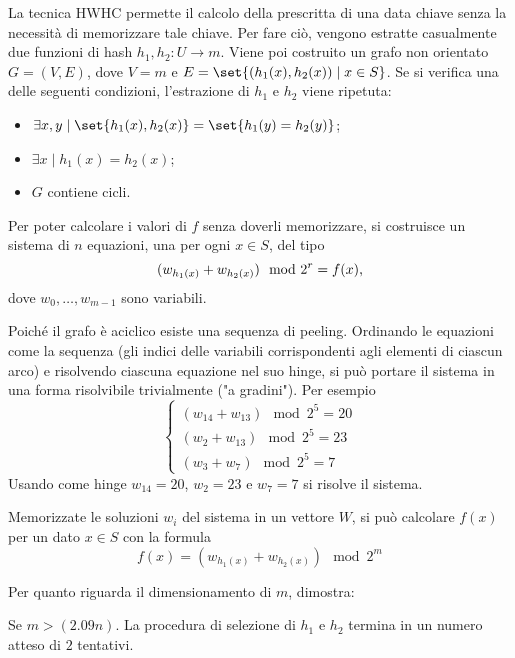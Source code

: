 La tecnica HWHC permette il calcolo della prescritta di una data chiave senza la necessità di memorizzare tale chiave. Per fare ciò, vengono estratte casualmente due funzioni di hash $h_1,h_2:U\to m$.
Viene poi costruito un grafo non orientato $G=(V,E)$, dove $V=m$ e $E=\set{(h_1(x),h_2(x))\mid x\in S}$.
Se si verifica una delle seguenti condizioni, l'estrazione di $h_1$ e $h_2$ viene ripetuta:
\begin{itemize}
	\item $\exists x,y\mid \set{h_1(x),h_2(x)}=\set{h_1(y)=h_2(y)}$;
	\item $\exists x\mid h_1(x)=h_2(x)$;
	\item $G$ contiene cicli.
\end{itemize}

Per poter calcolare i valori di $f$ senza doverli memorizzare, si costruisce un sistema di $n$ equazioni, una per ogni $x\in S$, del tipo
\begin{equation*}
	(w_{h_1(x)} + w_{h_2(x)}) \mod 2^r = f(x) \text,
\end{equation*}
dove $w_0,\dots,w_{m-1}$ sono variabili.

Poiché il grafo è aciclico esiste una sequenza di peeling. Ordinando le equazioni come la sequenza (gli indici delle variabili corrispondenti agli elementi di ciascun arco) e risolvendo ciascuna equazione nel suo hinge, si può portare il sistema in una forma risolvibile trivialmente ("a gradini").
Per esempio
\begin{equation*}
	\begin{cases}
		(w_{14} + w_{13}) \mod 2^5 = 20 \\
		(w_{2} + w_{13}) \mod 2^5 = 23  \\
		(w_{3} + w_{7}) \mod 2^5 = 7
	\end{cases}
\end{equation*}
Usando come hinge $w_{14} = 20$, $w_{2} = 23$ e $w_{7} = 7$ si risolve il sistema.

Memorizzate le soluzioni $w_i$ del sistema in un vettore $W$, si può calcolare $f(x)$ per un dato $x\in S$ con la formula
\begin{equation*}
	f(x) = (w_{h_1(x)} + w_{h_2(x)}) \mod 2^m
\end{equation*}

Per quanto riguarda il dimensionamento di $m$, \cite{Majewski:96:MWHC} dimostra:
\begin{theorem}
	Se $m>(2.09n)$. La procedura di selezione di $h_1$ e $h_2$ termina in un numero atteso di $2$ tentativi.
\end{theorem}

